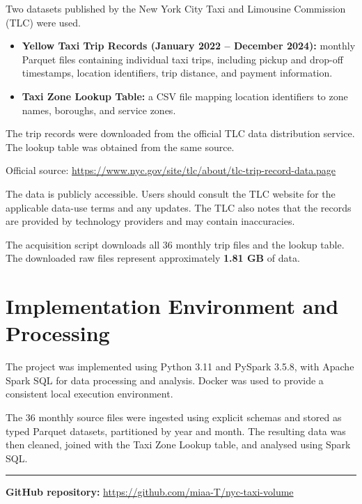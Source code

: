 \documentclass[10pt,a4paper]{article}
\begin{document}
Two datasets published by the New York City Taxi and Limousine Commission
(TLC) were used.

\begin{itemize}
    \item \textbf{Yellow Taxi Trip Records (January 2022 -- December 2024):}
    monthly Parquet files containing individual taxi trips, including
    pickup and drop-off timestamps, location identifiers, trip distance,
    and payment information.

    \item \textbf{Taxi Zone Lookup Table:}
    a CSV file mapping location identifiers to zone names, boroughs,
    and service zones.
\end{itemize}

The trip records were downloaded from the official TLC data distribution
service. The lookup table was obtained from the same source.

Official source:
\url{https://www.nyc.gov/site/tlc/about/tlc-trip-record-data.page}

The data is publicly accessible. Users should consult the TLC website
for the applicable data-use terms and any updates. The TLC also notes
that the records are provided by technology providers and may contain
inaccuracies.

The acquisition script downloads all 36 monthly trip files and the
lookup table. The downloaded raw files represent approximately
\textbf{1.81 GB} of data.

\section{Implementation Environment and Processing}

The project was implemented using Python 3.11 and PySpark 3.5.8,
with Apache Spark SQL for data processing and analysis. Docker was
used to provide a consistent local execution environment.

The 36 monthly source files were ingested using explicit schemas
and stored as typed Parquet datasets, partitioned by year and month.
The resulting data was then cleaned, joined with the Taxi Zone Lookup
table, and analysed using Spark SQL.

\vspace{5pt}
\hrule
\vspace{4pt}
\textbf{GitHub repository:}
\url{https://github.com/miaa-T/nyc-taxi-volume}

\newpage
\end{document}
